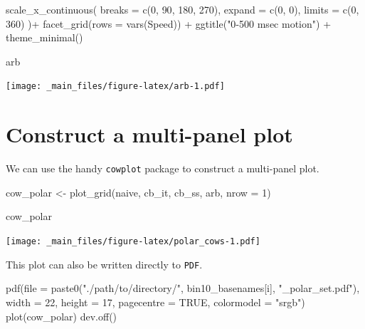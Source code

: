 \documentclass[
]{book}
\newenvironment{Shaded}{\begin{snugshade}}{\end{snugshade}}
\newcommand{\AttributeTok}[1]{\textcolor[rgb]{0.77,0.63,0.00}{#1}}
\newcommand{\ConstantTok}[1]{\textcolor[rgb]{0.00,0.00,0.00}{#1}}
\newcommand{\DecValTok}[1]{\textcolor[rgb]{0.00,0.00,0.81}{#1}}
\newcommand{\FunctionTok}[1]{\textcolor[rgb]{0.00,0.00,0.00}{#1}}
\newcommand{\NormalTok}[1]{#1}
\newcommand{\OtherTok}[1]{\textcolor[rgb]{0.56,0.35,0.01}{#1}}
\newcommand{\SpecialCharTok}[1]{\textcolor[rgb]{0.00,0.00,0.00}{#1}}
\newcommand{\StringTok}[1]{\textcolor[rgb]{0.31,0.60,0.02}{#1}}
\begin{document}
\begin{Shaded}
\begin{Highlighting}[]
  \FunctionTok{scale\_x\_continuous}\NormalTok{(}
    \AttributeTok{breaks =} \FunctionTok{c}\NormalTok{(}\DecValTok{0}\NormalTok{, }\DecValTok{90}\NormalTok{, }\DecValTok{180}\NormalTok{, }\DecValTok{270}\NormalTok{),}
    \AttributeTok{expand =} \FunctionTok{c}\NormalTok{(}\DecValTok{0}\NormalTok{, }\DecValTok{0}\NormalTok{),}
    \AttributeTok{limits =} \FunctionTok{c}\NormalTok{(}\DecValTok{0}\NormalTok{, }\DecValTok{360}\NormalTok{)}
\NormalTok{  )}\SpecialCharTok{+}
  \FunctionTok{facet\_grid}\NormalTok{(}\AttributeTok{rows =} \FunctionTok{vars}\NormalTok{(Speed)) }\SpecialCharTok{+}
  \FunctionTok{ggtitle}\NormalTok{(}\StringTok{"0{-}500 msec motion"}\NormalTok{) }\SpecialCharTok{+}
  \FunctionTok{theme\_minimal}\NormalTok{()}

\NormalTok{arb}
\end{Highlighting}
\end{Shaded}

\texttt{[image: \_main\_files/figure-latex/arb-1.pdf]}

\hypertarget{construct-a-multi-panel-plot}{%
\section{Construct a multi-panel plot}\label{construct-a-multi-panel-plot}}

We can use the handy \texttt{cowplot} package to construct a multi-panel plot.

\begin{Shaded}
\begin{Highlighting}[]
\NormalTok{cow\_polar }\OtherTok{\textless{}{-}}
  \FunctionTok{plot\_grid}\NormalTok{(naive, cb\_it, cb\_ss, arb,}
            \AttributeTok{nrow =} \DecValTok{1}\NormalTok{)}

\NormalTok{cow\_polar}
\end{Highlighting}
\end{Shaded}

\texttt{[image: \_main\_files/figure-latex/polar\_cows-1.pdf]}

This plot can also be written directly to \texttt{PDF}.

\begin{Shaded}
\begin{Highlighting}[]
\FunctionTok{pdf}\NormalTok{(}\AttributeTok{file =}
      \FunctionTok{paste0}\NormalTok{(}\StringTok{"./path/to/directory/"}\NormalTok{,}
\NormalTok{             bin10\_basenames[i],}
             \StringTok{"\_polar\_set.pdf"}\NormalTok{),}
    \AttributeTok{width =} \DecValTok{22}\NormalTok{, }\AttributeTok{height =} \DecValTok{17}\NormalTok{,}
    \AttributeTok{pagecentre =} \ConstantTok{TRUE}\NormalTok{, }\AttributeTok{colormodel =} \StringTok{"srgb"}\NormalTok{)}
\FunctionTok{plot}\NormalTok{(cow\_polar)}
\FunctionTok{dev.off}\NormalTok{()}
\end{Highlighting}
\end{Shaded}
\end{document}
